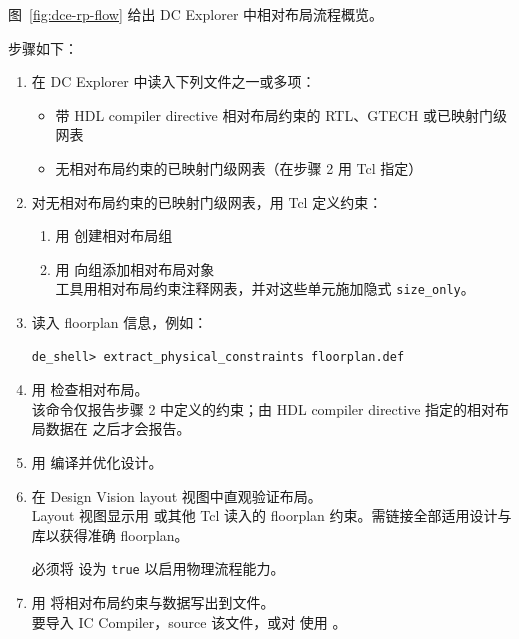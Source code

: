 图~\ref{fig:dce-rp-flow} 给出 DC Explorer 中相对布局流程概览。


步骤如下：
\begin{enumerate}
  \item 在 DC Explorer 中读入下列文件之一或多项：
  \begin{itemize}
    \item 带 HDL compiler directive 相对布局约束的 RTL、GTECH 或已映射门级网表
    \item 无相对布局约束的已映射门级网表（在步骤 2 用 Tcl 指定）
  \end{itemize}
  \item 对无相对布局约束的已映射门级网表，用 Tcl 定义约束：
  \begin{enumerate}
    \item 用  创建相对布局组
    \item 用  向组添加相对布局对象\\
          工具用相对布局约束注释网表，并对这些单元施加隐式 \texttt{size\_only}。
  \end{enumerate}
  \item 读入 floorplan 信息，例如：
\begin{lstlisting}
de_shell> extract_physical_constraints floorplan.def
\end{lstlisting}
  \item 用  检查相对布局。\\
        该命令仅报告步骤 2 中定义的约束；由 HDL compiler directive 指定的相对布局数据在  之后才会报告。
  \item 用  编译并优化设计。
  \item 在 Design Vision layout 视图中直观验证布局。\\
        Layout 视图显示用  或其他 Tcl 读入的 floorplan 约束。需链接全部适用设计与库以获得准确 floorplan。
\begin{noteBox}
必须将  设为 \texttt{true} 以启用物理流程能力。
\end{noteBox}
  \item 用  将相对布局约束与数据写出到文件。\\
        要导入 IC Compiler，source 该文件，或对  使用 。
\end{enumerate}


